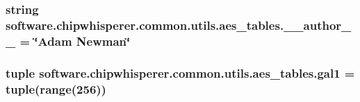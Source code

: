\subsubsection[{\+\_\+\+\_\+author\+\_\+\+\_\+}]{\setlength{\rightskip}{0pt plus 5cm}string software.\+chipwhisperer.\+common.\+utils.\+aes\+\_\+tables.\+\_\+\+\_\+author\+\_\+\+\_\+ = \char`\"{}Adam Newman\char`\"{}}\label{namespacesoftware_1_1chipwhisperer_1_1common_1_1utils_1_1aes__tables_a5bdf3ad5a7320d31ff6ed501039aa318}
\hypertarget{namespacesoftware_1_1chipwhisperer_1_1common_1_1utils_1_1aes__tables_a8db7db3cf4ca416d399871ffe89e1322}{}
\subsubsection[{gal1}]{\setlength{\rightskip}{0pt plus 5cm}tuple software.\+chipwhisperer.\+common.\+utils.\+aes\+\_\+tables.\+gal1 = tuple(range(256))}\label{namespacesoftware_1_1chipwhisperer_1_1common_1_1utils_1_1aes__tables_a8db7db3cf4ca416d399871ffe89e1322}
\hypertarget{namespacesoftware_1_1chipwhisperer_1_1common_1_1utils_1_1aes__tables_af10137d96fddc559ceabb73ee844ecb3}{}

